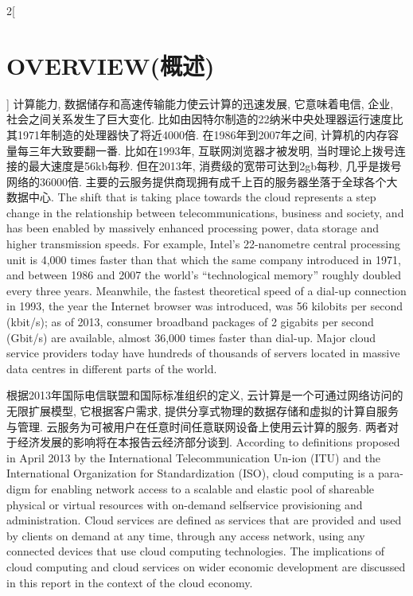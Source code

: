 \documentclass[a4paper, UTF8, 12pt]{article}
\begin{document}
\begin{paracol}{2}[\section{OVERVIEW(概述)}]
    \switchcolumn*
    计算能力, 数据储存和高速传输能力使云计算的迅速发展, 它意味着电信, 企业, 社会之间关系发生了巨大变化. 比如由因特尔制造的22纳米中央处理器运行速度比其1971年制造的处理器快了将近4000倍. 在1986年到2007年之间, 计算机的内存容量每三年大致要翻一番. 比如在1993年, 互联网浏览器才被发明, 当时理论上拨号连接的最大速度是56kb每秒. 但在2013年, 消费级的宽带可达到2gb每秒, 几乎是拨号网络的36000倍. 主要的云服务提供商现拥有成千上百的服务器坐落于全球各个大数据中心.
    \switchcolumn
    The shift that is taking place towards the cloud represents a step change in the relationship between telecommunications, business and society, and has been enabled by massively enhanced processing power, data storage and higher transmission speeds. For example, Intel’s 22-nanometre central processing unit is 4,000 times faster than that which the same company introduced in 1971, and between 1986 and 2007 the world’s “technological memory” roughly doubled every three years. Meanwhile, the fastest theoretical speed of a dial-up connection in 1993, the year the Internet browser was introduced, was 56 kilobits per second (kbit/s); as of 2013, consumer broadband packages of 2 gigabits per second (Gbit/s) are available, almost 36,000 times faster than dial-up. Major cloud service providers today have hundreds of thousands of servers located in massive data centres in different parts of the world. 

    \switchcolumn*
    根据2013年国际电信联盟和国际标准组织的定义, 云计算是一个可通过网络访问的无限扩展模型, 它根据客户需求, 提供分享式物理的数据存储和虚拟的计算自服务与管理. 云服务为可被用户在任意时间任意联网设备上使用云计算的服务. 两者对于经济发展的影响将在本报告云经济部分谈到.
    \switchcolumn
    According to definitions proposed in April 2013 by the International Telecommunication Un-ion (ITU) and the International Organization for Standardization (ISO), cloud computing is a para-digm for enabling network access to a scalable and elastic pool of shareable physical or virtual resources with on-demand selfservice provisioning and administration. Cloud services are defined as services that are provided and used by clients on demand at any time, through any access network, using any connected devices that use cloud computing technologies. The implications of cloud computing and cloud services on wider economic development are discussed in this report in the context of the cloud economy. 

    \switchcolumn*
    \paragraph{} 
    \switchcolumn

\end{paracol}
\end{document}
